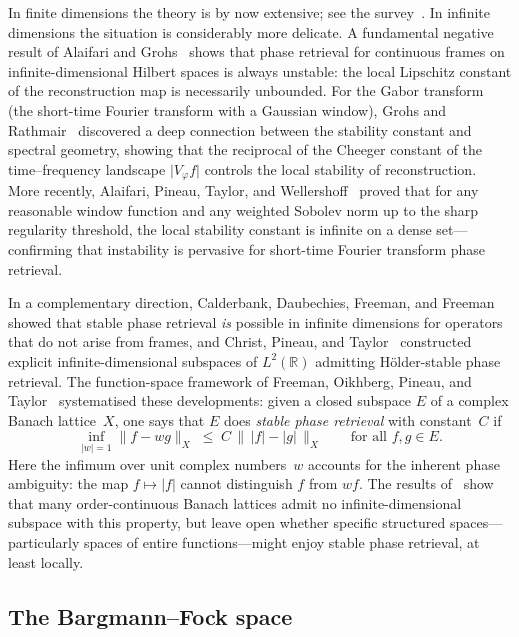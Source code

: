\documentclass[11pt]{amsart}
\theoremstyle{definition}
\theoremstyle{remark}
\begin{document}
In finite dimensions the theory is by now extensive; see the
survey~\cite{grohs2020survey}.  In infinite dimensions the situation is
considerably more delicate.  A fundamental negative result of Alaifari and
Grohs~\cite{alaifari2017continuous} shows that phase retrieval for continuous
frames on infinite-dimensional Hilbert spaces is always unstable: the local
Lipschitz constant of the reconstruction map is necessarily unbounded.  For
the Gabor transform (the short-time Fourier transform with a Gaussian
window), Grohs and Rathmair~\cite{grohs2020survey} discovered a deep
connection between the stability constant and spectral geometry, showing that
the reciprocal of the Cheeger constant of the time--frequency landscape
$\lvert V_\varphi f \rvert$ controls the local stability of reconstruction.  More
recently, Alaifari, Pineau, Taylor, and
Wellershoff~\cite{alaifari2021gabor} proved that for any reasonable
window function and any weighted Sobolev norm up to the sharp regularity
threshold, the local stability constant is infinite on a dense set---confirming
that instability is pervasive for short-time Fourier transform phase retrieval.

In a complementary direction, Calderbank, Daubechies, Freeman, and
Freeman~\cite{calderbank2022stable} showed that stable phase retrieval
\emph{is} possible in infinite dimensions for operators that do not arise from
frames, and Christ, Pineau, and Taylor~\cite{christ2022examples} constructed
explicit infinite-dimensional subspaces of $L^2(\mathbb{R})$ admitting H\"older-stable
phase retrieval.  The function-space framework of Freeman, Oikhberg, Pineau,
and Taylor~\cite{FOTP} systematised these developments: given a closed
subspace $E$ of a complex Banach lattice~$X$, one says that $E$ does
\emph{stable phase retrieval} with constant~$C$ if
\[
\inf_{\lvert w \rvert=1}\lVert f - wg \rVert_X
\;\le\;
C\,\bigl\|\,\lvert f \rvert - \lvert g \rvert\,\bigr\|_X
\qquad
\text{for all } f,g \in E.
\]
Here the infimum over unit complex numbers~$w$ accounts for the inherent
phase ambiguity: the map $f \mapsto \lvert f \rvert$ cannot distinguish $f$ from
$wf$.  The results of~\cite{FOTP} show that many order-continuous Banach
lattices admit no infinite-dimensional subspace with this property, but leave
open whether specific structured spaces---particularly spaces of entire
functions---might enjoy stable phase retrieval, at least locally.

\subsection{The Bargmann--Fock space}
\end{document}
